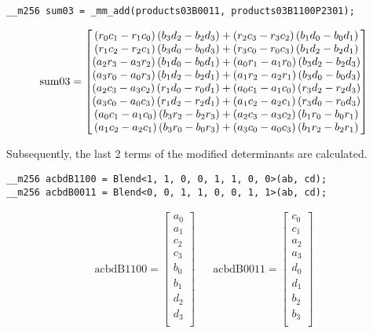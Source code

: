 \begin{verbatim}
__m256 sum03 = _mm_add(products03B0011, products03B1100P2301);
\end{verbatim} 
\begin{align*}
\mathrm{sum03} 
=
\begin{bmatrix}
  \left(r_0c_1 - r_1c_0\right)\left(b_3d_2 - b_2d_3\right) 
+ \left(r_2c_3 - r_3c_2\right)\left(b_1d_0 - b_0d_1\right)\\
  \left(r_1c_2 - r_2c_1\right)\left(b_3d_0 - b_0d_3\right)
+ \left(r_3c_0 - r_0c_3\right)\left(b_1d_2 - b_2d_1\right)\\
  \left(a_2r_3 - a_3r_2\right)\left(b_1d_0 - b_0d_1\right)
+ \left(a_0r_1 - a_1r_0\right)\left(b_3d_2 - b_2d_3\right)\\
  \left(a_3r_0 - a_0r_3\right)\left(b_1d_2 - b_2d_1\right)
+ \left(a_1r_2 - a_2r_1\right)\left(b_3d_0 - b_0d_3\right)\\
  \left(a_2c_3 - a_3c_2\right)\left(r_1d_0 - r_0d_1\right)
+ \left(a_0c_1 - a_1c_0\right)\left(r_3d_2 - r_2d_3\right)\\
  \left(a_3c_0 - a_0c_3\right)\left(r_1d_2 - r_2d_1\right)
+ \left(a_1c_2 - a_2c_1\right)\left(r_3d_0 - r_0d_3\right)\\
  \left(a_0c_1 - a_1c_0\right)\left(b_3r_2 - b_2r_3\right)
+ \left(a_2c_3 - a_3c_2\right)\left(b_1r_0 - b_0r_1\right)\\
  \left(a_1c_2 - a_2c_1\right)\left(b_3r_0 - b_0r_3\right)
+ \left(a_3c_0 - a_0c_3\right)\left(b_1r_2 - b_2r_1\right)\\
\end{bmatrix}
\end{align*}




Subsequently, the last 2 terms of the modified determinants are calculated.
\begin{verbatim}
__m256 acbdB1100 = Blend<1, 1, 0, 0, 1, 1, 0, 0>(ab, cd);
__m256 acbdB0011 = Blend<0, 0, 1, 1, 0, 0, 1, 1>(ab, cd);
\end{verbatim} 
\begin{align*}
\mathrm{acbdB1100} 
=
\begin{bmatrix}
a_0\\
a_1\\
c_2\\
c_3\\
b_0\\
b_1\\
d_2\\
d_3\\
\end{bmatrix}
&&
\mathrm{acbdB0011} 
=
\begin{bmatrix}
c_0\\
c_1\\
a_2\\
a_3\\
d_0\\
d_1\\
b_2\\
b_3\\
\end{bmatrix}
\end{align*}


